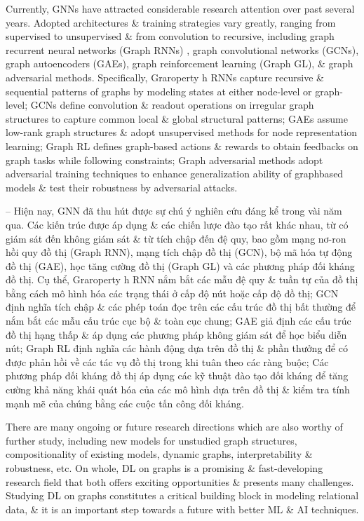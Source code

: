 \documentclass{article}
\begin{document}
\begin{itemize}
\begin{itemize}
\begin{enumerate}
        \end{enumerate}
        Currently, GNNs have attracted considerable research attention over past several years. Adopted architectures \& training strategies vary greatly, ranging from supervised to unsupervised \& from convolution to recursive, including graph recurrent neural networks (Graph RNNs) , graph convolutional networks (GCNs), graph autoencoders (GAEs), graph reinforcement learning (Graph GL), \& graph adversarial methods. Specifically, Graroperty h RNNs capture recursive \& sequential patterns of graphs by modeling states at either node-level or graph-level; GCNs define convolution \& readout operations on irregular graph structures to capture common local \& global structural patterns; GAEs assume low-rank graph structures \& adopt unsupervised methods for node representation learning; Graph RL defines graph-based actions \& rewards to obtain feedbacks on graph tasks while following constraints; Graph adversarial methods adopt adversarial training techniques to enhance generalization ability of graphbased models \& test their robustness by adversarial attacks.

        -- Hiện nay, GNN đã thu hút được sự chú ý nghiên cứu đáng kể trong vài năm qua. Các kiến trúc được áp dụng \& các chiến lược đào tạo rất khác nhau, từ có giám sát đến không giám sát \& từ tích chập đến đệ quy, bao gồm mạng nơ-ron hồi quy đồ thị (Graph RNN), mạng tích chập đồ thị (GCN), bộ mã hóa tự động đồ thị (GAE), học tăng cường đồ thị (Graph GL) và các phương pháp đối kháng đồ thị. Cụ thể, Graroperty h RNN nắm bắt các mẫu đệ quy \& tuần tự của đồ thị bằng cách mô hình hóa các trạng thái ở cấp độ nút hoặc cấp độ đồ thị; GCN định nghĩa tích chập \& các phép toán đọc trên các cấu trúc đồ thị bất thường để nắm bắt các mẫu cấu trúc cục bộ \& toàn cục chung; GAE giả định các cấu trúc đồ thị hạng thấp \& áp dụng các phương pháp không giám sát để học biểu diễn nút; Graph RL định nghĩa các hành động dựa trên đồ thị \& phần thưởng để có được phản hồi về các tác vụ đồ thị trong khi tuân theo các ràng buộc; Các phương pháp đối kháng đồ thị áp dụng các kỹ thuật đào tạo đối kháng để tăng cường khả năng khái quát hóa của các mô hình dựa trên đồ thị \& kiểm tra tính mạnh mẽ của chúng bằng các cuộc tấn công đối kháng.

        There are many ongoing or future research directions which are also worthy of further study, including new models for unstudied graph structures, compositionality of existing models, dynamic graphs, interpretability \& robustness, etc. On whole, DL on graphs is a promising \& fast-developing research field that both offers exciting opportunities \& presents many challenges. Studying DL on graphs constitutes a critical building block in modeling relational data, \& it is an important step towards a future with better ML \& AI techniques.


\end{itemize}
\end{itemize}
\end{document}
